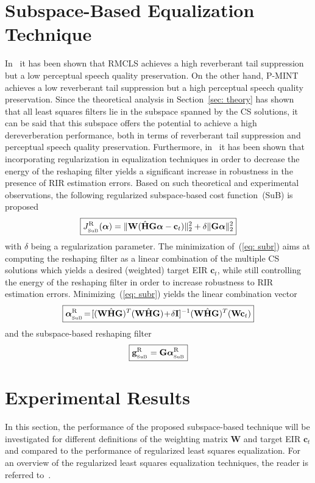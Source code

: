 \documentclass[10pt]{IEEEtran}
\begin{document}
\section{Subspace-Based Equalization Technique}
In~\cite{Kodrasi_ITASLP_2013} it has been shown that RMCLS achieves a high reverberant tail suppression but a low perceptual speech quality preservation. 
On the other hand, P-MINT achieves a low reverberant tail suppression but a high perceptual speech quality preservation.
Since the theoretical analysis in Section~\ref{sec: theory} has shown that all least squares filters lie in the subspace spanned by the CS solutions, it can be said that this subspace offers the potential to achieve a high dereverberation performance, both in terms of reverberant tail suppression and perceptual speech quality preservation.
Furthermore, in~\cite{Kodrasi_ITASLP_2013} it has been shown that incorporating regularization in equalization techniques in order to decrease the energy of the reshaping filter yields a significant increase in robustness in the presence of RIR estimation errors.
Based on such theoretical and experimental observations, the following regularized subspace-based cost function~(SuB) is proposed
\begin{equation}
  \label{eq: subr}
\boxed{J_{_{\rm SuB}}^{\rm R}(\boldsymbol \alpha) = \|\mathbf{W}(\hat{\mathbf{H}}\mathbf{G}\boldsymbol \alpha-\mathbf{c}_t) \|_2^2 + \delta \|\mathbf{G}\boldsymbol \alpha \|_2^2}
\end{equation}
with $\delta$ being a regularization parameter.
The minimization of~(\ref{eq: subr}) aims at computing the reshaping filter as a linear combination of the multiple CS solutions which yields a desired (weighted) target EIR $\mathbf{c}_t$, while still controlling the energy of the reshaping filter in order to increase robustness to RIR estimation errors.
Minimizing~(\ref{eq: subr}) yields the linear combination vector
\begin{equation}
\boxed{\boldsymbol \alpha_{_{\rm SuB}}^{\rm R} \!=\! [(\mathbf{W}\hat{\mathbf{H}}\mathbf{G})^T(\mathbf{W}\hat{\mathbf{H}}\mathbf{G}) \!+\! \delta \mathbf{I}]^{-1}(\mathbf{W}\hat{\mathbf{H}}\mathbf{G})^T(\mathbf{W}\mathbf{c}_t)}
\end{equation}
and the subspace-based reshaping filter
\begin{equation}
\boxed{\mathbf{g}_{_{\rm SuB}}^{\rm R} = \mathbf{G}\boldsymbol \alpha_{_{\rm SuB}}^{\rm R}}
\end{equation}

\section{Experimental Results}
In this section, the performance of the proposed subspace-based technique will be investigated for different definitions of the weighting matrix $\mathbf{W}$ and target EIR $\mathbf{c}_t$ and compared to the performance of regularized least squares equalization. For an overview of the regularized least squares equalization techniques, the reader is referred to~\cite{Kodrasi_ITASLP_2013}.
\end{document}
